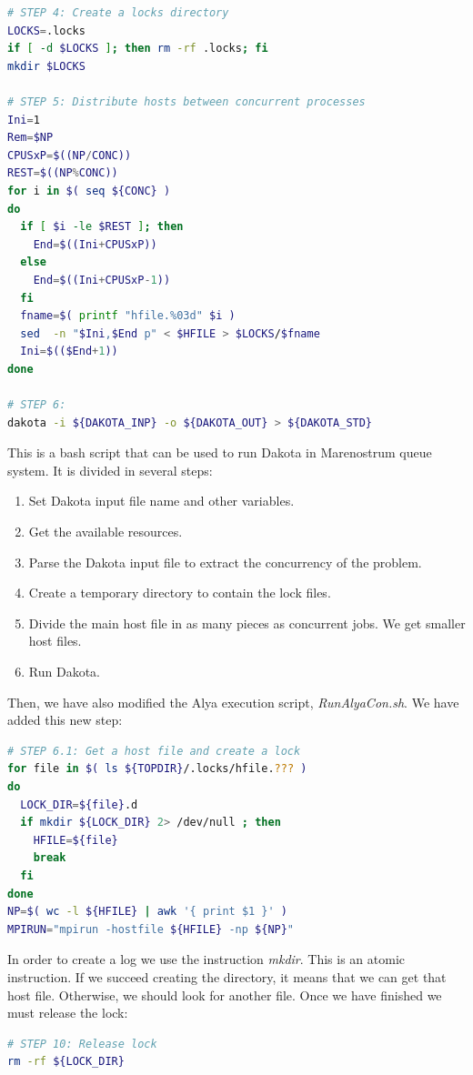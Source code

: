 \documentclass[12pt,a4paper,article]{memoir}
\begin{document}
\begin{itemize}
\begin{lstlisting}[style=MyCodeStyle,language=bash]
# STEP 4: Create a locks directory
LOCKS=.locks
if [ -d $LOCKS ]; then rm -rf .locks; fi
mkdir $LOCKS

# STEP 5: Distribute hosts between concurrent processes
Ini=1
Rem=$NP
CPUSxP=$((NP/CONC))
REST=$((NP%CONC))
for i in $( seq ${CONC} )
do
  if [ $i -le $REST ]; then
    End=$((Ini+CPUSxP))
  else
    End=$((Ini+CPUSxP-1))
  fi
  fname=$( printf "hfile.%03d" $i )
  sed  -n "$Ini,$End p" < $HFILE > $LOCKS/$fname
  Ini=$(($End+1))
done

# STEP 6:
dakota -i ${DAKOTA_INP} -o ${DAKOTA_OUT} > ${DAKOTA_STD}
\end{lstlisting}

This is a bash script that can be used to run Dakota in Marenostrum queue system. It is divided in several steps:
\begin{enumerate}[label=Step \arabic*:,align=right,labelwidth=2.0cm,leftmargin=2.0cm]
\item Set Dakota input file name and other variables.
\item Get the available resources.
\item Parse the Dakota input file to extract the concurrency of the problem.
\item Create a temporary directory to contain the lock files.
\item Divide the main host file in as many pieces as concurrent jobs. We get smaller host files.
\item Run Dakota.
\end{enumerate}

Then, we have also modified the Alya execution script, \textit{RunAlyaCon.sh}. We have added this new step:

\begin{lstlisting}[style=MyCodeStyle,language=bash]
# STEP 6.1: Get a host file and create a lock
for file in $( ls ${TOPDIR}/.locks/hfile.??? )
do
  LOCK_DIR=${file}.d
  if mkdir ${LOCK_DIR} 2> /dev/null ; then
    HFILE=${file}
    break
  fi
done
NP=$( wc -l ${HFILE} | awk '{ print $1 }' )
MPIRUN="mpirun -hostfile ${HFILE} -np ${NP}"
\end{lstlisting}

In order to create a log we use the instruction \textit{mkdir}. This is an atomic instruction. If we succeed creating the directory, it means that we can get that host file. Otherwise, we should look for another file. Once we have finished we must release the lock:

\begin{lstlisting}[style=MyCodeStyle,language=bash]
# STEP 10: Release lock
rm -rf ${LOCK_DIR}
\end{lstlisting}


\end{itemize}
\end{document}

